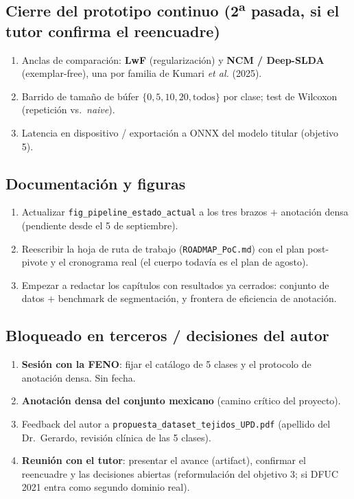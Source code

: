 \documentclass[12pt,letterpaper]{report}
\begin{document}
\subsection*{Cierre del prototipo continuo (2\textsuperscript{a} pasada, si el tutor confirma el reencuadre)}

\begin{enumerate}[leftmargin=1.6em, resume]
    \item Anclas de comparación: \textbf{LwF} (regularización) y \textbf{NCM / Deep-SLDA}
        (exemplar-free), una por familia de Kumari \emph{et al.} (2025).
    \item Barrido de tamaño de búfer $\{0, 5, 10, 20, \text{todos}\}$ por clase; test de Wilcoxon
        (repetición vs.\ \emph{naive}).
    \item Latencia en dispositivo / exportación a ONNX del modelo titular (objetivo 5).
\end{enumerate}

\subsection*{Documentación y figuras}

\begin{enumerate}[leftmargin=1.6em, resume]
    \item Actualizar \texttt{fig\_pipeline\_estado\_actual} a los tres brazos $+$ anotación densa
        (pendiente desde el 5 de septiembre).
    \item Reescribir la hoja de ruta de trabajo (\texttt{ROADMAP\_PoC.md}) con el plan post-pivote y
        el cronograma real (el cuerpo todavía es el plan de agosto).
    \item Empezar a redactar los capítulos con resultados ya cerrados: conjunto de datos $+$
        benchmark de segmentación, y frontera de eficiencia de anotación.
\end{enumerate}

\subsection*{Bloqueado en terceros / decisiones del autor}

\begin{enumerate}[leftmargin=1.6em, resume]
    \item \textbf{Sesión con la FENO}: fijar el catálogo de 5 clases y el protocolo de anotación
        densa. Sin fecha.
    \item \textbf{Anotación densa del conjunto mexicano} (camino crítico del proyecto).
    \item Feedback del autor a \texttt{propuesta\_dataset\_tejidos\_UPD.pdf} (apellido del Dr.\
        Gerardo, revisión clínica de las 5 clases).
    \item \textbf{Reunión con el tutor}: presentar el avance (artifact), confirmar el reencuadre y
        las decisiones abiertas (reformulación del objetivo 3; si DFUC 2021 entra como segundo
        dominio real).
\end{enumerate}
\end{document}

